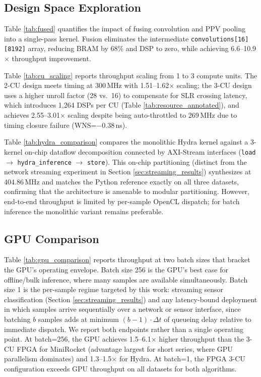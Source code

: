 \subsection{Design Space Exploration}
\label{sec:design_space}



Table \ref{tab:fused} quantifies the impact of fusing convolution and PPV pooling into a single-pass kernel. Fusion eliminates the intermediate \texttt{convolutions[16][8192]} array, reducing BRAM by 68\% and DSP to zero, while achieving 6.6--10.9$\times$ throughput improvement.



Table \ref{tab:cu_scaling} reports throughput scaling from 1 to 3 compute units. The 2-CU design meets timing at 300\,MHz with 1.51--1.62$\times$ scaling; the 3-CU design uses a higher unroll factor (28 vs.\ 16) to compensate for SLR crossing latency, which introduces 1,264 DSPs per CU (Table \ref{tab:resource_annotated}), and achieves 2.55--3.01$\times$ scaling despite being auto-throttled to 269\,MHz due to timing closure failure (WNS=$-$0.38\,ns).



Table \ref{tab:hydra_comparison} compares the monolithic Hydra kernel against a 3-kernel on-chip dataflow decomposition connected by AXI-Stream interfaces (\texttt{load} $\to$ \texttt{hydra\_inference} $\to$ \texttt{store}). This on-chip partitioning (distinct from the network streaming experiment in Section \ref{sec:streaming_results}) synthesizes at 404.86\,MHz and matches the Python reference exactly on all three datasets, confirming that the architecture is amenable to modular partitioning. However, end-to-end throughput is limited by per-sample OpenCL dispatch; for batch inference the monolithic variant remains preferable.

\subsection{GPU Comparison}
\label{sec:gpu_comparison}



Table \ref{tab:gpu_comparison} reports throughput at two batch sizes that bracket the GPU's operating envelope. Batch size 256 is the GPU's best case for offline/bulk inference, where many samples are available simultaneously. Batch size 1 is the per-sample regime targeted by this work: streaming sensor classification (Section \ref{sec:streaming_results}) and any latency-bound deployment in which samples arrive sequentially over a network or sensor interface, since batching $b$ samples adds at minimum $(b{-}1) \cdot \Delta t$ of queueing delay relative to immediate dispatch. We report both endpoints rather than a single operating point. At batch=256, the GPU achieves 1.5--6.1$\times$ higher throughput than the 3-CU FPGA for MiniRocket (advantage largest for short series, where GPU parallelism dominates) and 1.3--1.5$\times$ for Hydra. At batch=1, the FPGA 3-CU configuration exceeds GPU throughput on all datasets for both algorithms.

